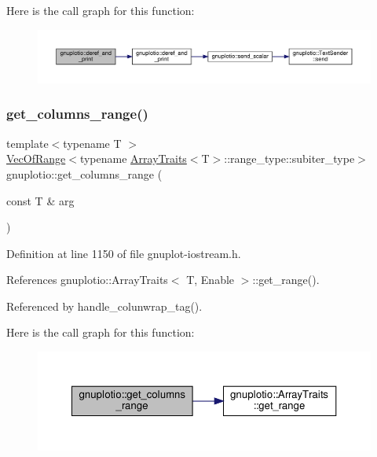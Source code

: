 Here is the call graph for this function\+:\nopagebreak
\begin{figure}[H]
\begin{center}
\leavevmode
\includegraphics[width=350pt]{namespacegnuplotio_ae768911c8adb77bfc080d5e4561573e6_cgraph}
\end{center}
\end{figure}
\mbox{\label{namespacegnuplotio_a64984827dd8debb9098ad1afdde8e409}} 
\subsubsection{\texorpdfstring{get\+\_\+columns\+\_\+range()}{get\_columns\_range()}}
{\footnotesize\ttfamily template$<$typename T $>$ \\
\hyperlink{classgnuplotio_1_1_vec_of_range}{Vec\+Of\+Range}$<$typename \hyperlink{classgnuplotio_1_1_array_traits}{Array\+Traits}$<$T$>$\+::range\+\_\+type\+::subiter\+\_\+type$>$ gnuplotio\+::get\+\_\+columns\+\_\+range (\begin{DoxyParamCaption}\item[{const T \&}]{arg }\end{DoxyParamCaption})}



Definition at line 1150 of file gnuplot-\/iostream.\+h.



References gnuplotio\+::\+Array\+Traits$<$ T, Enable $>$\+::get\+\_\+range().



Referenced by handle\+\_\+colunwrap\+\_\+tag().

Here is the call graph for this function\+:\nopagebreak
\begin{figure}[H]
\begin{center}
\leavevmode
\includegraphics[width=350pt]{namespacegnuplotio_a64984827dd8debb9098ad1afdde8e409_cgraph}
\end{center}
\end{figure}
\mbox{\label{namespacegnuplotio_abb416b68686102ba84a2cb53c96b64e9}} 

